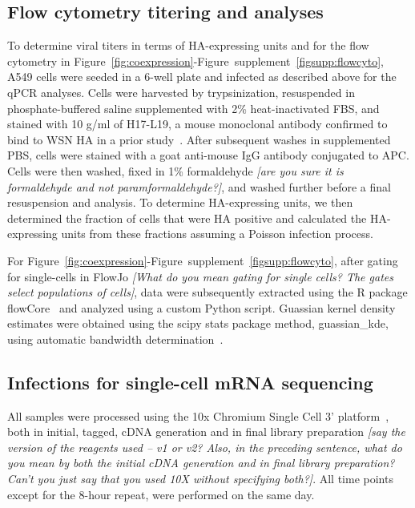\documentclass[9pt,lineno]{elife}
\newcommand{\jdbcomment}[1]{\emph{\color{red} [#1]}}
\begin{document}
\subsection{Flow cytometry titering and analyses}
To determine viral titers in terms of HA-expressing units and for the flow cytometry in Figure~\ref{fig:coexpression}-Figure~supplement~\ref{figsupp:flowcyto}, A549 cells were seeded in a 6-well plate and infected as described above for the qPCR analyses.
Cells were harvested by trypsinization, resuspended in phosphate-buffered saline supplemented with 2\% heat-inactivated FBS, and stained with 10 \si{\micro}g/ml of H17-L19, a mouse monoclonal antibody confirmed to bind to WSN HA in a prior study~\citep{Doud:2017bw}.
After subsequent washes in supplemented PBS, cells were stained with a goat anti-mouse IgG antibody conjugated to APC.
Cells were then washed, fixed in 1\% formaldehyde\jdbcomment{are you sure it is formaldehyde and not paramformaldehyde?}, and washed further before a final resuspension and analysis. 
To determine HA-expressing units, we then determined the fraction of cells that were HA positive and calculated the HA-expressing units from these fractions assuming a Poisson infection process.

For Figure~\ref{fig:coexpression}-Figure~supplement~\ref{figsupp:flowcyto}, after gating for single-cells in FlowJo\jdbcomment{What do you mean gating for single cells? The gates select populations of cells}, data were subsequently extracted using the R package flowCore~\citep{LeMeur:2007uo} and analyzed using a custom Python script.
Guassian kernel density estimates were obtained using the scipy stats package method, guassian\_kde, using automatic bandwidth determination~\citep{vanderWalt:2017dp}.

\subsection{Infections for single-cell mRNA sequencing}
All samples were processed using the 10x Chromium Single Cell 3' platform~\cite{zheng2017massively}, both in initial, tagged, cDNA generation and in final library preparation \jdbcomment{say the version of the reagents used -- v1 or v2? Also, in the preceding sentence, what do you mean by both the initial cDNA generation and in final library preparation? Can't you just say that you used 10X without specifying both?}.
All time points except for the 8-hour repeat, were performed on the same day.
\end{document}
